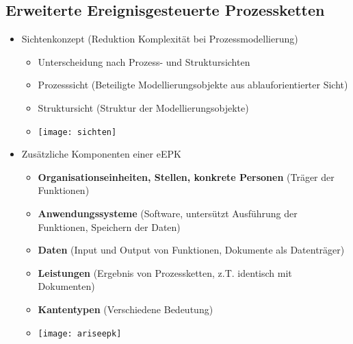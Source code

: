 \subsection{Erweiterte Ereignisgesteuerte Prozessketten}
\begin{itemize}
	\item Sichtenkonzept (Reduktion Komplexität bei Prozessmodellierung)
		\begin{itemize}
		\item Unterscheidung nach Prozess- und Struktursichten
		\item Prozesssicht (Beteiligte Modellierungsobjekte aus ablauforientierter Sicht)
		\item Struktursicht (Struktur der Modellierungsobjekte)
		\item[] \texttt{[image: sichten]}
		\end{itemize}
	
	\item Zusätzliche Komponenten einer eEPK
		\begin{itemize}
		\item \textbf{Organisationseinheiten, Stellen, konkrete Personen} (Träger der Funktionen)
		\item \textbf{Anwendungssysteme} (Software, untersützt Ausführung der Funktionen, Speichern der Daten)
		\item \textbf{Daten} (Input und Output von Funktionen, Dokumente als Datenträger)
		\item \textbf{Leistungen} (Ergebnis von Prozessketten, z.T. identisch mit Dokumenten)
		\item \textbf{Kantentypen} (Verschiedene Bedeutung)
		\item[] \texttt{[image: ariseepk]}
		\end{itemize}


\end{itemize}

